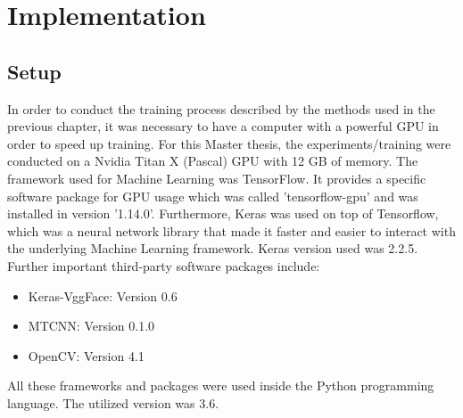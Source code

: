 \chapter{Implementation}
\section{Setup}

In order to conduct the training process described by the methods used in the previous chapter, it was necessary to have a computer with a powerful GPU in order to speed up training. For this Master thesis, the experiments/training were conducted on a Nvidia Titan X (Pascal) GPU with 12 GB of memory. 
\newline\newline
The framework used for Machine Learning was TensorFlow. It provides a specific software package for GPU usage which was called 'tensorflow-gpu' and was installed in version '1.14.0'. Furthermore, Keras was used on top of Tensorflow, which was a neural network library that made it faster and easier to interact with the underlying Machine Learning framework. Keras version used was 2.2.5.
\newline\newline
Further important third-party software packages include:
\begin{itemize}
    \item Keras-VggFace: Version 0.6
    \item MTCNN:         Version 0.1.0
    \item OpenCV:        Version 4.1
\end{itemize}
All these frameworks and packages were used inside the Python programming language. The utilized version was 3.6.


